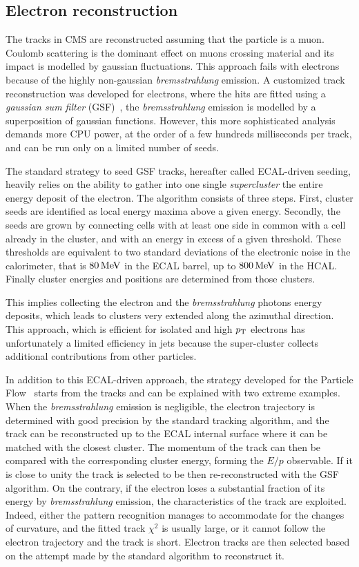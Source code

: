 \subsection{Electron reconstruction}\label{sec:electron_reco}
The tracks in CMS are reconstructed assuming that the particle is a muon.
Coulomb scattering is the dominant effect on muons crossing material and its
impact is modelled by gaussian fluctuations. This approach fails with
electrons because of the highly non-gaussian \emph{bremsstrahlung} emission. A
customized track reconstruction was developed for electrons, where the hits
are fitted using a \emph{gaussian sum filter} (GSF)~\cite{pf:gsf.tracks},
\ie the \emph{bremsstrahlung} emission is modelled by a superposition of
gaussian functions. However, this more sophisticated analysis demands more CPU power, at the order of a few hundreds milliseconds per track, and can be run only on a limited number of seeds.

The standard strategy to seed GSF tracks, hereafter called ECAL-driven seeding, heavily relies on
the ability to gather into one single \emph{supercluster} the entire energy deposit of the electron. 
The algorithm consists of three steps. First, cluster seeds are identified
as local energy maxima above a given energy. Secondly, the seeds are
grown by connecting cells with at least one side in common with
a cell already in the cluster, and with an energy in excess of a given
threshold. These thresholds are equivalent to two standard deviations of the electronic noise in the calorimeter, that is $\unit[80]{MeV}$ in the ECAL barrel, up to $\unit[800]{MeV}$ in the HCAL. Finally cluster energies and positions are determined from those clusters.

This implies collecting the electron and the \emph{bremsstrahlung} photons energy deposits, 
which leads to clusters very extended along the azimuthal direction. 
This approach, which is efficient for isolated and high $p_\mathrm{T}$ electrons has unfortunately 
a limited efficiency in jets because the super-cluster collects 
additional contributions from other particles.

In addition to this ECAL-driven approach, the strategy developed for the Particle Flow~\cite{pf:electron.reconstruction} starts from
the tracks and can be explained with two extreme examples. 
When the \emph{bremsstrahlung} emission is negligible, the electron
trajectory is determined with good precision by
the standard tracking algorithm, and the track can be reconstructed up to the ECAL internal
surface where it can be matched with the closest cluster. 
The momentum of the track can then be compared with the corresponding cluster energy, 
forming the $E/p$ observable. If it is close to unity the track is selected to be then re-reconstructed
with the GSF algorithm. On the contrary, if the electron loses a substantial fraction of its energy by \emph{bremsstrahlung} emission, the characteristics of the track are exploited. Indeed, either the pattern recognition manages
to accommodate for the changes of curvature, and the fitted track $\chi^2$ is usually large, or
it cannot follow the electron trajectory and the track is short.  
Electron tracks are then selected based on the attempt made by the standard algorithm to reconstruct it. 

